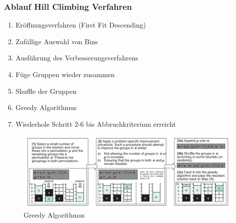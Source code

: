 \documentclass{beamer}
\begin{document}
\begin{frame}
\frametitle{Ablauf Hill Climbing Verfahren}
\begin{footnotesize}
\begin{enumerate}
\item Eröffnungsverfahren (First Fit Descending)
\item Zufällige Auswahl von Bins 
\item Ausführung des Verbesserungsverfahrens
\item Füge Gruppen wieder zusammen
\item Shuffle der Gruppen
\item Greedy Algorithmus
\item Wiederhole Schritt 2-6 bis Abbruchkriterium erreicht
\end{enumerate}
\end{footnotesize}

\begin{figure}[!htbp]
\begin{center}
\includegraphics[scale=0.25]{img/ablauf.png}
\end{center}
\caption{Greedy Algorithmus}
\label{fig:architecture}
\end{figure}
\end{frame}
\end{document}
